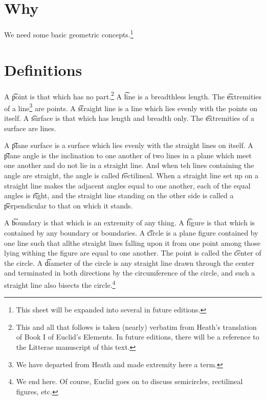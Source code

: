
\section*{Why}

We need some basic geometric concepts.\footnote{This sheet will be expanded into several in future editions.}
\section*{Definitions}

A \t{point} is that which has no part.\footnote{This and all that follows is taken (nearly) verbatim from Heath's translation of Book I of Euclid's Elements. In future editions, there will be a reference to the Litterae manuscript of this text.}
A \t{line} is a breadthless length.
The \t{extremities of a line}\footnote{We have departed from Heath and made extremity here a term.}
are points.
A \t{straight line} is a line which lies evenly with the points on itself.
A \t{surface} is that which has length and breadth only.
The \t{extremities of a surface} are lines.

A \t{plane surface} is a surface which lies evenly with the straight lines on itself.
A \t{plane angle} is the inclination to one another of two lines in a plane which meet one another and do not lie in a straight line.
And when teh lines containing the angle are straight, the angle is called \t{rectilineal}.
When a straight line set up on a straight line makes the adjacent angles equal to one another, each of the equal angles is \t{right}, and the straight line standing on the other side is called a \t{perpendicular} to that on which it stands.


%  

A \t{boundary} is that which is an extremity of any thing.
A \t{figure} is that which is contained by any boundary or boundaries.
A \t{circle} is a plane figure contained by one line such that allthe straight lines falling upon it from one point among those lying withing the figure are equal to one another.
The point is called the \t{center} of the circle.
A \t{diameter} of the circle is any straight line drawn through the center and terminated in both directions by the circumference of the circle, and such a straight line also bisects the circle.\footnote{We end here. Of course, Euclid goes on to discuss semicircles, rectilineal figures, etc.}

\blankpage
